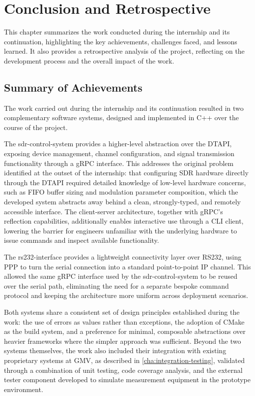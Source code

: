 %
\chapter{Conclusion and Retrospective}
\label{cha:conclusion-retrospective}
This chapter summarizes the work conducted during the internship and its
continuation, highlighting the key achievements, challenges faced, and lessons
learned. It also provides a retrospective analysis of the project, reflecting
on the development process and the overall impact of the work.

\section{Summary of Achievements}

The work carried out during the internship and its continuation resulted in two
complementary software systems, designed and implemented in C++ over the
course of the project.

The \gls{sdr-control-system} provides a higher-level abstraction over the
\gls{DTAPI}, exposing device management, channel configuration, and signal
transmission functionality through a \gls{gRPC} interface. This addresses
the original problem identified at the outset of the internship: that
configuring \gls{SDR} hardware directly through the \gls{DTAPI} required
detailed knowledge of low-level hardware concerns, such as FIFO buffer sizing
and modulation parameter composition, which the developed system abstracts
away behind a clean, strongly-typed, and remotely accessible interface. The
client-server architecture, together with \gls{gRPC}'s reflection
capabilities, additionally enables interactive use through a \gls{CLI}
client, lowering the barrier for engineers unfamiliar with the underlying
hardware to issue commands and inspect available functionality.

The \gls{rs232-interface} provides a lightweight connectivity layer over
\gls{RS232}, using \gls{PPP} to turn the serial connection into a standard
point-to-point IP channel. This allowed the same gRPC interface used by the
\gls{sdr-control-system} to be reused over the serial path, eliminating the
need for a separate bespoke command protocol and keeping the architecture more
uniform across deployment scenarios.

Both systems share a consistent set of design principles established during
the work: the use of errors as values rather than exceptions, the adoption of
CMake as the build system, and a preference for minimal, composable
abstractions over heavier frameworks where the simpler approach was
sufficient. Beyond the two systems themselves, the work also included their
integration with existing proprietary systems at \gls{GMV}, as described in
\autoref{cha:integration-testing}, validated through a combination of unit
testing, code coverage analysis, and the external tester component developed
to simulate measurement equipment in the prototype environment.

